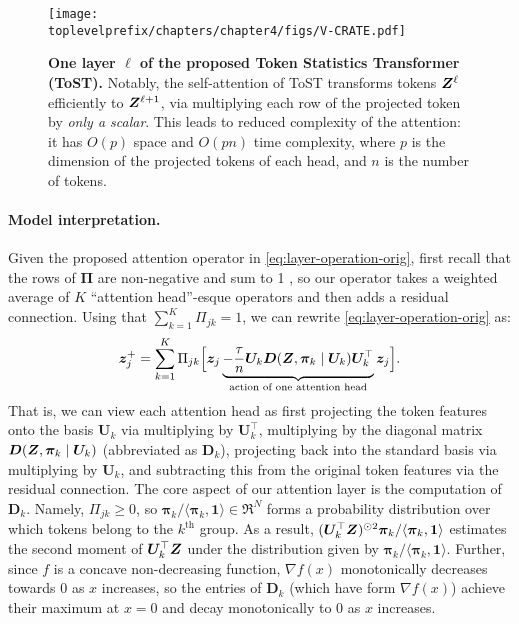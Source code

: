 \documentclass[../../book-main.tex]{subfiles}
\begin{document}
\begin{figure}[t]
    \centering \texttt{[image: \\toplevelprefix/chapters/chapter4/figs/V-CRATE.pdf]}
    \vspace{-1mm}
    \caption{\small \textbf{One layer $\ell$ of the proposed Token Statistics Transformer (ToST).} Notably, the self-attention of ToST transforms tokens $\bm{Z}^{\ell}$ efficiently to $\bm{Z}^{\ell+1}$, via multiplying each row of the projected token by \textit{only a scalar}. This leads to reduced complexity of the attention: it has $O(p)$ space and $O(pn)$ time complexity, where $p$ is the dimension of the projected tokens of each head, and $n$ is the number of tokens.
    }
    \label{fig:vcrate-architecture}
\end{figure}

\paragraph{Model interpretation.} Given the proposed attention operator in \eqref{eq:layer-operation-orig}, first recall that the rows of $\bm\Pi$ are non-negative and sum to 1
, so our operator takes a weighted average of $K$ ``attention head''-esque operators and then adds a residual connection. Using that \(\sum_{k = 1}^{K}\Pi_{jk} = 1\), we can rewrite \eqref{eq:layer-operation-orig} as: %
\vspace{-2mm}
\begin{equation}
\label{eq:z_up}
    \bm{z}_j^+ = \sum_{k=1}^K \Pi_{jk} \Big[ \bm{z}_j \underbrace{- \frac{\tau}{n} \bm U_{k} \bm D(\bm{Z}, \bm \pi_{k} \mid \bm U_{k}) \bm U_{k}^{\top}}_{\text{action of one attention head}} \bm{z}_j \Big].
\end{equation}
That is, we can view each attention head as first projecting the token features onto the basis $\bm U_{k}$ via multiplying by $\bm U_k^\top$, multiplying by the diagonal matrix $\bm D(\bm{Z}, \bm \pi_{k} \mid \bm U_{k})$ (abbreviated as \(\bm D_{k}\)), projecting back into the standard basis via multiplying by $\bm U_{k}$, and subtracting this from the original token features via the residual connection. The core aspect of our attention layer is the computation of $\bm D_{k}$.  Namely, \(\Pi_{jk} \geq 0\), so $\bm \pi_k / \langle \bm \pi_{k}, \bm 1\rangle \in \Re^N$ forms a probability distribution over which tokens belong to the $k^\text{th}$ group.  As a result, $(\bm U^\top_k \bm{Z})^{\odot 2} \bm \pi_k / \langle \bm \pi_{k}, \bm 1\rangle$ estimates the second moment of $\bm U_k^\top \bm{Z}$ under the distribution given by $\bm \pi_k /  \langle \bm \pi_{k}, \bm 1\rangle$.  Further, since $f$ is a concave non-decreasing function, $\nabla f(x)$ monotonically decreases towards $0$ as $x$ increases, so the entries of $\bm D_{k}$ (which have form $\nabla f(x)$) achieve their maximum at $x=0$ %
and decay monotonically to $0$ as $x$ increases.
\end{document}
